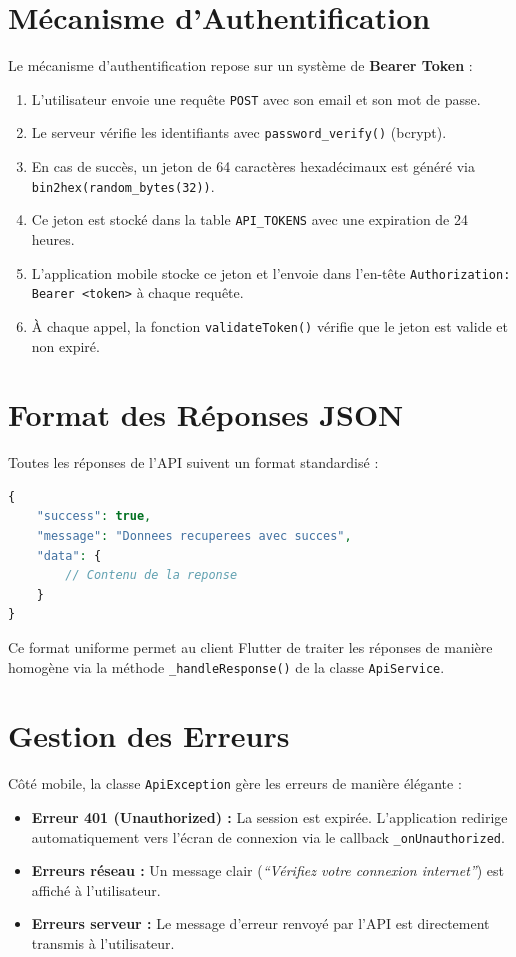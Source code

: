 \documentclass[12pt, a4paper]{report}
\begin{document}
\section{Mécanisme d'Authentification}

Le mécanisme d'authentification repose sur un système de \textbf{Bearer Token} :

\begin{enumerate}
    \item L'utilisateur envoie une requête \texttt{POST} avec son email et son mot de passe.
    \item Le serveur vérifie les identifiants avec \texttt{password\_verify()} (bcrypt).
    \item En cas de succès, un jeton de 64 caractères hexadécimaux est généré via \texttt{bin2hex(random\_bytes(32))}.
    \item Ce jeton est stocké dans la table \texttt{API\_TOKENS} avec une expiration de 24 heures.
    \item L'application mobile stocke ce jeton et l'envoie dans l'en-tête \texttt{Authorization: Bearer <token>} à chaque requête.
    \item À chaque appel, la fonction \texttt{validateToken()} vérifie que le jeton est valide et non expiré.
\end{enumerate}

\section{Format des Réponses JSON}

Toutes les réponses de l'API suivent un format standardisé :

\begin{lstlisting}[language=PHP, caption={Format de réponse JSON standardisé de l'API Chronos.}]
{
    "success": true,
    "message": "Donnees recuperees avec succes",
    "data": {
        // Contenu de la reponse
    }
}
\end{lstlisting}

Ce format uniforme permet au client Flutter de traiter les réponses de manière homogène via la méthode \texttt{\_handleResponse()} de la classe \texttt{ApiService}.

\section{Gestion des Erreurs}

Côté mobile, la classe \texttt{ApiException} gère les erreurs de manière élégante :
\begin{itemize}
    \item \textbf{Erreur 401 (Unauthorized) :} La session est expirée. L'application redirige automatiquement vers l'écran de connexion via le callback \texttt{\_onUnauthorized}.
    \item \textbf{Erreurs réseau :} Un message clair (\textit{``Vérifiez votre connexion internet''}) est affiché à l'utilisateur.
    \item \textbf{Erreurs serveur :} Le message d'erreur renvoyé par l'API est directement transmis à l'utilisateur.
\end{itemize}
\end{document}
